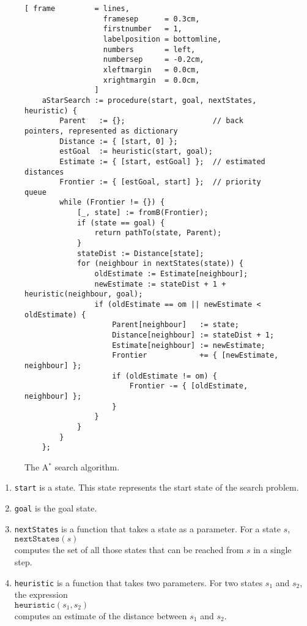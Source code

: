 \begin{figure}[!ht]
\centering
\begin{Verbatim}[ frame         = lines,
                  framesep      = 0.3cm,
                  firstnumber   = 1,
                  labelposition = bottomline,
                  numbers       = left,
                  numbersep     = -0.2cm,
                  xleftmargin   = 0.0cm,
                  xrightmargin  = 0.0cm,
                ]
    aStarSearch := procedure(start, goal, nextStates, heuristic) {
        Parent   := {};                    // back pointers, represented as dictionary
        Distance := { [start, 0] };
        estGoal  := heuristic(start, goal);
        Estimate := { [start, estGoal] };  // estimated distances
        Frontier := { [estGoal, start] };  // priority queue
        while (Frontier != {}) {
            [_, state] := fromB(Frontier);
            if (state == goal) {
                return pathTo(state, Parent);
            }
            stateDist := Distance[state];
            for (neighbour in nextStates(state)) {
                oldEstimate := Estimate[neighbour];
                newEstimate := stateDist + 1 + heuristic(neighbour, goal);
                if (oldEstimate == om || newEstimate < oldEstimate) {
                    Parent[neighbour]   := state;
                    Distance[neighbour] := stateDist + 1;
                    Estimate[neighbour] := newEstimate;
                    Frontier            += { [newEstimate, neighbour] };
                    if (oldEstimate != om) {
                        Frontier -= { [oldEstimate, neighbour] };
                    }
                }
            }
        }
    };
\end{Verbatim}
\vspace*{-0.3cm}
\caption{The A$^*$ search algorithm.}
\label{fig:a-star-search.stlx}
\end{figure}
\begin{enumerate}
\item \texttt{start} is a state.  This state represents the start state of the search problem.
\item \texttt{goal} is the goal state.
\item \texttt{nextStates} is a function that takes a state as a parameter.  For a state $s$,
      \\[0.2cm]
      \hspace*{1.3cm}
      $\mathtt{nextStates}(s)$
      \\[0.2cm]
      computes the set of all those states that can be reached from $s$ in a single step.
\item \texttt{heuristic} is a function that takes two parameters.
      For two states $s_1$ and $s_2$, the expression
      \\[0.2cm]
      \hspace*{1.3cm}
      $\texttt{heuristic}(s_1, s_2)$
      \\[0.2cm]
      computes an estimate of the distance between $s_1$ and $s_2$.
\end{enumerate}
